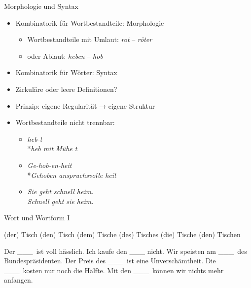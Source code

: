 \begin{frame}
  {Morphologie und Syntax}
  \pause
  \begin{itemize}[<+->]
    \item Kombinatorik für \alert{Wortbestandteile}: Morphologie
      \begin{itemize}[<+->]
        \item Wortbestandteile \zB mit \alert{Umlaut}: \textit{rot} -- \textit{röter}
        \item oder \alert{Ablaut}: \textit{heben} -- \textit{hob}
      \end{itemize}
    \item Kombinatorik für \alert{Wörter}: Syntax
      \Zeile
    \item \alert{Zirkuläre oder leere Definitionen?}
    \item {} Prinzip: eigene Regularität → eigene Struktur
      \Zeile
    \item Wortbestandteile \alert{nicht trennbar}:
      \begin{itemize}
        \item \textit{heb-t}\\
          *\textit{heb mit Mühe t}
        \item \textit{Ge-hob-en-heit} \\
          *\textit{Gehoben anspruchsvolle heit}
        \item \textit{Sie geht schnell heim.}\\
          \textit{Schnell geht sie heim.}
      \end{itemize}
  \end{itemize}
\end{frame}

\begin{frame}
  {Wort und Wortform I}
  \pause
  \begin{exe}
    \ex
    \begin{xlist}
      \ex (der) Tisch
      \pause
      \ex (den) Tisch
      \pause
      \ex (dem) Tisch\alert{e}
      \pause
      \ex (des) Tisch\alert{es}
      \pause
      \ex (die) Tisch\alert{e}
      \pause
      \ex (den) Tisch\alert{en}
    \end{xlist}
  \end{exe}
  \pause
  \begin{exe}
    \ex
    \begin{xlist}
      \ex Der \_\_\_\ ist voll hässlich.
      \pause
      \ex Ich kaufe den \_\_\_ nicht.
      \pause
      \ex Wir speisten am \_\_\_\ des Bundespräsidenten.
      \pause
      \ex Der Preis des \_\_\_\ ist eine Unverschämtheit.
      \pause
      \ex Die \_\_\_\ kosten nur noch die Hälfte.
      \pause
      \ex Mit den \_\_\_\ können wir nichts mehr anfangen.
    \end{xlist}
  \end{exe}
\end{frame}

